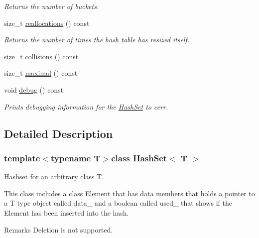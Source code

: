 \begin{DoxyCompactItemize}
\begin{DoxyCompactList}\small\item\em Returns the number of buckets. \end{DoxyCompactList}\item 
\hypertarget{class_hash_set_a85c4d8f088f5679d587e06c07c362ac5}{size\-\_\-t \hyperlink{class_hash_set_a85c4d8f088f5679d587e06c07c362ac5}{reallocations} () const }\label{class_hash_set_a85c4d8f088f5679d587e06c07c362ac5}

\begin{DoxyCompactList}\small\item\em Returns the number of times the hash table has resized itself. \end{DoxyCompactList}\item 
size\-\_\-t \hyperlink{class_hash_set_a54fa80d8af72e633479aa4520a7e5d2f}{collisions} () const 
\item 
size\-\_\-t \hyperlink{class_hash_set_a21daebf2846f630ab4300c4c0468c929}{maximal} () const 
\item 
\hypertarget{class_hash_set_a83defc0197ac5362971ff18a210205f6}{void \hyperlink{class_hash_set_a83defc0197ac5362971ff18a210205f6}{debug} () const }\label{class_hash_set_a83defc0197ac5362971ff18a210205f6}

\begin{DoxyCompactList}\small\item\em Prints debugging information for the \hyperlink{class_hash_set}{Hash\-Set} to cerr. \end{DoxyCompactList}\end{DoxyCompactItemize}


\subsection{Detailed Description}
\subsubsection*{template$<$typename T$>$class Hash\-Set$<$ T $>$}

Hashset for an arbitrary class T. 

This class includes a class Element that has data members that holds a pointer to a T type object called data\-\_\- and a boolean called used\-\_\- that shows if the Element has been inserted into the hash.

\begin{DoxyRemark}{Remarks}
Deletion is not supported. 
\end{DoxyRemark}


